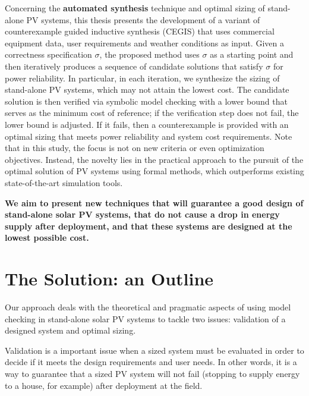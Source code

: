 Concerning the \textbf{automated synthesis} technique and optimal sizing of stand-alone PV systems, this thesis presents the development of a variant of counterexample guided inductive synthesis (CEGIS) that uses commercial equipment data, user requirements and weather conditions as input. Given a correctness specification $\sigma$, the proposed method uses $\sigma$ as a starting point and then iteratively produces a sequence of candidate solutions that satisfy $\sigma$ for power reliability. In particular, in each iteration, we synthesize the sizing of stand-alone PV systems, which may not attain the lowest cost. The candidate solution is then verified via symbolic model checking with a lower bound that serves as the minimum cost of reference; if the verification step does not fail, the lower bound is adjusted. If it fails, then a counterexample is provided with an optimal sizing that meets power reliability and system cost requirements. Note that in this study, the focus is not on new criteria or even optimization objectives. Instead, the novelty lies in the practical approach to the pursuit of the optimal solution of PV systems using formal methods, which outperforms existing state-of-the-art simulation tools.

\textbf{ We aim to present new techniques that will guarantee a good design of stand-alone solar PV systems, that do not cause a drop in energy supply after deployment, and that these systems are designed at the lowest possible cost.}

\section{The Solution: an Outline}

Our approach deals with the theoretical and pragmatic aspects of using model checking in stand-alone solar PV systems to tackle two issues: validation of a designed system and optimal sizing. 

Validation is a important issue when a sized system must be evaluated in order to decide if it meets the design requirements and user needs. In other words, it is a way to guarantee that a sized PV system will not fail (stopping to supply energy to a house, for example) after deployment at the field.

